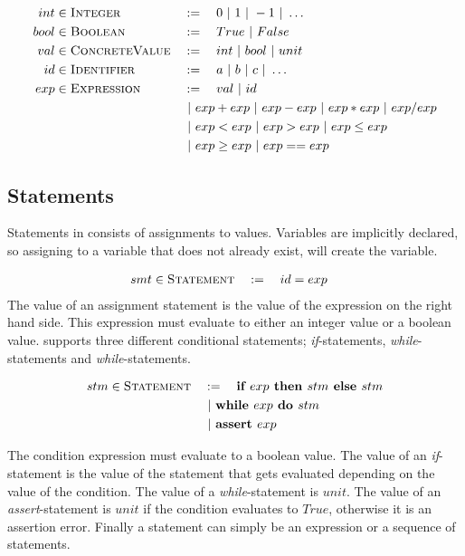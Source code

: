 \begin{alignat*}{3}
	int & \in \textsc{Integer} && := \quad 0 \ | \  1 \ | \  -1 \ | \  \ldots\\
	bool & \in \textsc{Boolean} && := \quad True \ | \  False\\
	val & \in \textsc{ConcreteValue} && := \quad int \ | \  bool \ | \  unit\\
	id & \in \textsc{Identifier} && := \quad a \ | \  b \ | \  c \ | \  \ldots \\
	exp & \in \textsc{Expression} && := \quad val \ | \  id\\ & && \ | \  exp + exp \ | \  exp - exp \ | \  exp * exp \ | \  exp / exp\\
	& && \ | \  exp < exp \ | \  exp > exp \ | \  exp \leq exp\\
	& &&  \ | \  exp \geq exp \ | \  exp == exp
\end{alignat*}


\subsection{Statements}
Statements in \explanguage consists of assignments to values. Variables are implicitly declared, so assigning to a variable that does not already exist, will create the variable. 

\begin{alignat*}{3}
	smt & \in \textsc{Statement} && := \quad id  = exp 
\end{alignat*} 
The value of an assignment statement is the value of the expression on the right hand side. This expression must evaluate to either an integer value or a boolean value. \explanguage supports three different conditional statements;  \textsl{if}-statements, \textsl{while}-statements and \textsl{while}-statements. 

\begin{alignat*}{3}
	stm & \in \textsc{Statement} && := \quad \textbf{if }  exp \textbf{ then } stm \textbf{ else } stm\\
	& && \ | \  \textbf{while } exp \textbf{ do } stm\\
	& && \ | \  \textbf{assert } exp
\end{alignat*}

The condition expression must evaluate to a boolean value. The value of an \textsl{if}-statement is the value of the statement that gets evaluated depending on the value of the condition. The value of a \textsl{while}-statement is $unit$. The value of an \textsl{assert}-statement is $unit$ if the condition evaluates to $True$, otherwise it is an assertion error. Finally a statement can simply be an expression or a sequence of statements. 

